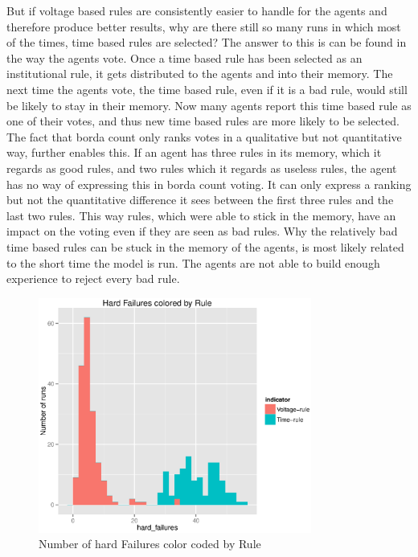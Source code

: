 \documentclass[a4paper]{article}
\begin{document}
But if voltage based rules are consistently easier to handle for the agents and therefore produce better results, why are there 
still so many runs in which most of the times, time based rules are selected? The answer to this is can be found in the way the agents
vote. Once a time based rule has been selected as an institutional rule, it gets distributed to the agents and into their memory. The 
next time the agents vote, the time based rule, even if it is a bad rule, would still be likely to stay in their memory. Now many 
agents report this time based rule as one of their votes, and thus new time based rules are more likely to be selected. The fact that 
borda count only ranks votes in a qualitative but not quantitative way, further enables this. 
If an agent has three rules in its memory, which it regards as good rules, and two rules which it regards as useless rules, the agent 
has no way of expressing this in borda count voting. It can only  express a ranking but not the quantitative difference it sees 
between the first three rules and the last two rules. This way rules, which were able to stick in the memory, have an impact on the 
voting even if they are seen as bad rules. Why the relatively bad time based rules can be stuck in the memory of the agents, is most 
likely related to the short time the model is run. The agents are not able to build enough experience to reject every bad rule. \\
\begin{figure}
\centering
 \includegraphics[width = 0.8\textwidth]{hard_failure_colored_first_look.eps}
 \caption{Number of hard Failures color coded by Rule}
 \label{colored_hard}
\end{figure}
\newpage
\end{document}
